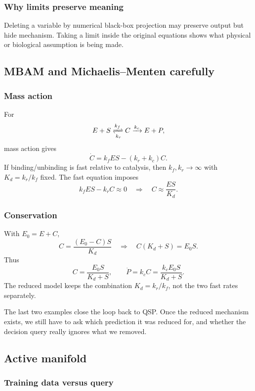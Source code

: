 \subsubsection*{Why limits preserve meaning}

Deleting a variable by numerical black-box projection may preserve output but hide mechanism.  Taking a limit inside the original equations shows what physical or biological assumption is being made.

\subsection{MBAM and Michaelis--Menten carefully}

\subsubsection*{Mass action}

For
\[
  E+S
  \xrightleftharpoons[k_r]{k_f}
  C
  \xrightarrow{k_c}
  E+P,
\]
mass action gives
\[
  \dot{C}=k_fES-(k_r+k_c)C.
\]
If binding/unbinding is fast relative to catalysis, then \(k_f,k_r\to\infty\) with \(K_d=k_r/k_f\) fixed.  The fast equation imposes
\[
  k_fES-k_rC\approx 0
  \quad\Rightarrow\quad
  C\approx \frac{ES}{K_d}.
\]

\subsubsection*{Conservation}

With \(E_0=E+C\),
\[
  C
  =
  \frac{(E_0-C)S}{K_d}
  \quad\Rightarrow\quad
  C(K_d+S)=E_0S.
\]
Thus
\[
  C=\frac{E_0S}{K_d+S},
  \qquad
  \dot{P}=k_cC
  =
  \frac{k_cE_0S}{K_d+S}.
\]
The reduced model keeps the combination \(K_d=k_r/k_f\), not the two fast rates separately.

\noindent
The last two examples close the loop back to QSP.  Once the reduced mechanism exists, we still have to ask which prediction it was reduced for, and whether the decision query really ignores what we removed.

\subsection{Active manifold}

\subsubsection*{Training data versus query}


